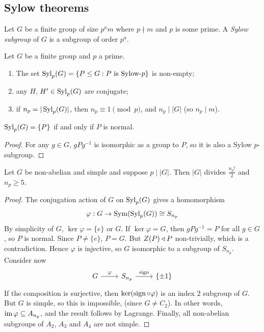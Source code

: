 \documentclass{../../template/note}
\begin{document}
    \subsection{Sylow theorems}

    Let $G$ be a finite group of size $p^am$ where $p \nmid m$ and $p$ is some prime. A \emph{Sylow subgroup} of $G$ is a subgroup of order $p^a$.

    \begin{theorem}
        Let $G$ be a finite group and $p$ a prime.
        \begin{enumerate}
            \item The set $\operatorname{Syl}_p(G) = \{P \leq G: P \text{ is Sylow-}p\}$ is non-empty;
            \item any $H$, $H' \in \operatorname{Syl}_p(G)$ are conjugate;
            \item if $n_p = |\operatorname{Syl}_p(G)|$, then $n_p \equiv 1 \pmod p$, and $n_p \mid |G|$ (so $n_p \mid m$).
        \end{enumerate}
    \end{theorem}
    
    \begin{corollary}
        $\operatorname{Syl}_p(G) = \{P\}$ if and only if $P$ is normal.
    \end{corollary}
    
    \begin{proof}
        For any $g \in G$, $gPg^{-1}$ is isomorphic as a group to $P$, so it is also a Sylow $p$-subgroup.
    \end{proof}
    
    \begin{corollary}
        \label{non-abelian-simple}
        Let $G$ be non-abelian and simple and suppose $p \mid |G|$. Then $|G|$ divides $\frac{n_p!}{2}$ and $n_p \geq 5$.
    \end{corollary}
    
    \begin{proof}
        The conjugation action of $G$ on $\operatorname{Syl}_p(G)$ gives a homomorphism
        \begin{align*}
            \varphi: G \to \operatorname{Sym}(\operatorname{Syl}_p(G)) \cong S_{n_p}
        \end{align*}
        By simplicity of $G$, $\ker \varphi = \{e\}$ or $G$. If $\ker \varphi = G$, then $gPg^{-1} = P$ for all $g \in G$, so $P$ is normal. Since $P \neq \{e\}$, $P = G$. But $Z(P) \triangleleft P$ non-trivially, which is a contradiction. Hence $\varphi$ is injective, so $G$ isomorphic to a subgroup of $S_{n_p}$. Consider now
        \[\begin{tikzcd}
            G & {S_{n_p}} & {\{\pm1\}}
            \arrow["\varphi", from=1-1, to=1-2]
            \arrow["\sign", from=1-2, to=1-3]
        \end{tikzcd}\]
        If the composition is surjective, then $\ker(\operatorname{sign} \circ \varphi)$ is an index 2 subgroup of $G$. But $G$ is simple, so this is impossible, (since $G \neq C_2$). In other words, $\operatorname{im} \varphi \subseteq A_{n_p}$, and the result follows by Lagrange. Finally, all non-abelian subgroups of $A_2$, $A_3$ and $A_4$ are not simple.
    \end{proof}
    
\end{document}
